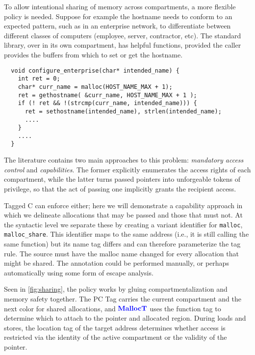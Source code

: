 \documentclass{llncs}
\begin{document}
To allow intentional sharing of memory across compartments, a more flexible policy is needed. 
Suppose for example the hostname needs to conform to an expected pattern, 
such as in an enterprise network, to differentiate between different classes of
computers (employee, server, contractor, etc). The standard library, 
over in its own compartment, has helpful functions, 
provided the caller provides the buffers from which to set or get the hostname. 

\begin{verbatim}
  void configure_enterprise(char* intended_name) {
    int ret = 0;
    char* curr_name = malloc(HOST_NAME_MAX + 1);
    ret = gethostname( &curr_name, HOST_NAME_MAX + 1 );
    if (! ret && !(strcmp(curr_name, intended_name))) {
      ret = sethostname(intended_name), strlen(intended_name);
      ....
    }
    ....
  }
\end{verbatim}

The literature contains two main approaches to this problem:
{\em mandatory access control} and {\em capabilities}. The former explicitly
enumerates the access rights of each compartment, while the latter turns passed
pointers into unforgeable tokens of privilege, so that the act of passing one
implicitly grants the recipient access.

Tagged C can enforce either; here we will demonstrate a capability approach
in which we delineate allocations that may be passed and those that must not.
At the syntactic level we separate these by creating a variant identifier for {\tt malloc},
{\tt malloc\_share}. This identifier maps to the same address (i.e., it is still calling the same function)
but its name tag differs and can therefore parameterize the tag rule. The source
must have the malloc name changed for every allocation that might be shared.
The annotation could be performed manually, or perhaps automatically using some form
of escape analysis.

Seen in \cref{fig:sharing}, the policy works by gluing compartmentalization and memory safety
together. The PC Tag carries the current compartment and the next color for shared allocations,
and \(\color{blue} \mathbf{MallocT}\) uses the function tag to determine which to attach to the pointer and allocated
region. During loads and stores, the location tag of the target address
determines whether access is restricted via the identity of the active compartment or
the validity of the pointer.

\end{document}
